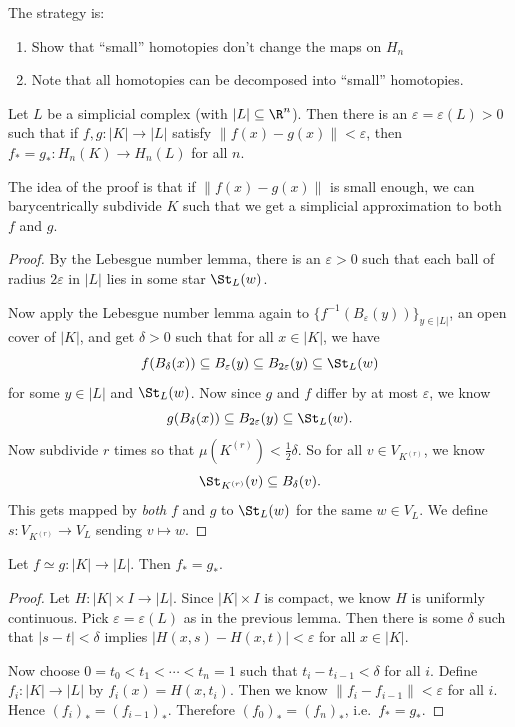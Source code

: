 \documentclass[a4paper]{article}
\begin{document}
The strategy is:
\begin{enumerate}
  \item Show that ``small'' homotopies don't change the maps on $H_n$
  \item Note that all homotopies can be decomposed into ``small'' homotopies.
\end{enumerate}

\begin{lemma}
  Let $L$ be a simplicial complex (with $|L| \subseteq \R^n$). Then there is an $\varepsilon = \varepsilon(L) > 0$ such that if $f, g: |K| \to |L|$ satisfy $\|f(x) - g(x)\| < \varepsilon$, then $f_* = g_*: H_n(K) \to H_n(L)$ for all $n$.
\end{lemma}
The idea of the proof is that if $\|f(x) - g(x)\|$ is small enough, we can barycentrically subdivide $K$ such that we get a simplicial approximation to both $f$ and $g$.
\begin{proof}
  By the Lebesgue number lemma, there is an $\varepsilon > 0$ such that each ball of radius $2\varepsilon$ in $|L|$ lies in some star $\St_L(w)$.

  Now apply the Lebesgue number lemma again to $\{f^{-1}(B_\varepsilon(y))\}_{y \in |L|}$, an open cover of $|K|$, and get $\delta > 0$ such that for all $x \in |K|$, we have
  \[
    f(B_\delta(x)) \subseteq B_\varepsilon(y) \subseteq B_{2\varepsilon}(y) \subseteq \St_L(w)
  \]
  for some $y \in |L|$ and $\St_L(w)$. Now since $g$ and $f$ differ by at most $\varepsilon$, we know
  \[
    g(B_\delta(x)) \subseteq B_{2\varepsilon}(y) \subseteq \St_L(w).
  \]
  Now subdivide $r$ times so that $\mu(K^{(r)}) < \frac{1}{2} \delta$. So for all $v \in V_{K^{(r)}}$, we know
  \[
    \St_{K^{(r)}} (v) \subseteq B_\delta(v).
  \]
  This gets mapped by \emph{both} $f$ and $g$ to $\St_L(w)$ for the same $w \in V_L$. We define $s: V_{K^{(r)}} \to V_L$ sending $v \mapsto w$.
\end{proof}

\begin{thm}
  Let $f\simeq g: |K| \to |L|$. Then $f_* = g_*$.
\end{thm}

\begin{proof}
  Let $H: |K| \times I \to |L|$. Since $|K|\times I$ is compact, we know $H$ is uniformly continuous. Pick $\varepsilon = \varepsilon(L)$ as in the previous lemma. Then there is some $\delta$ such that $|s - t| < \delta$ implies $|H(x, s) - H(x, t)| < \varepsilon$ for all $x \in |K|$.

  Now choose $0 = t_0 < t_1 < \cdots < t_n = 1$ such that $t_i - t_{i - 1} < \delta$ for all $i$. Define $f_i: |K| \to |L|$ by $f_i(x) = H(x, t_i)$. Then we know $\|f_i - f_{i - 1}\| < \varepsilon$ for all $i$. Hence $(f_i)_* = (f_{i - 1})_*$. Therefore $(f_0)_* = (f_n)_*$, i.e.\ $f_* = g_*$.
\end{proof}
\end{document}
